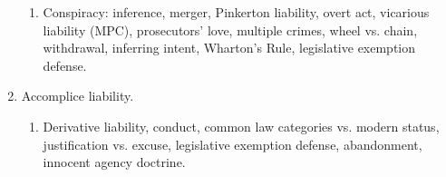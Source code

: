 \begin{enumerate}
\begin{enumerate}
        \item Conspiracy: inference, merger, Pinkerton liability, overt act, 
        vicarious liability (MPC), prosecutors' love, multiple crimes, wheel 
        vs. chain, withdrawal, inferring intent, Wharton's Rule, legislative 
        exemption defense.
    \end{enumerate}
    \item Accomplice liability.
    \begin{enumerate}
        \item Derivative liability, conduct, common law categories vs. modern 
        status, justification vs. excuse, legislative exemption defense, 
        abandonment, innocent agency doctrine.
    \end{enumerate}
\end{enumerate}
